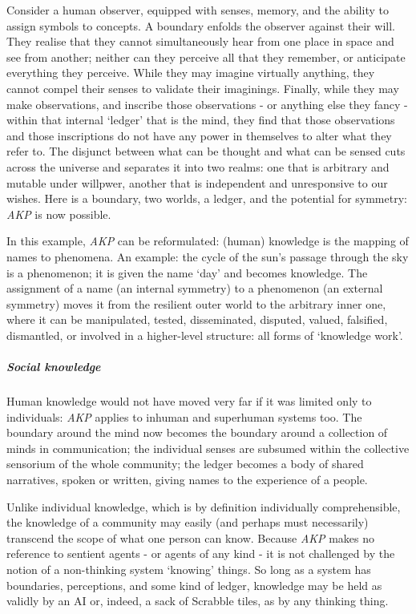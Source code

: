 \documentclass[a4paper,11pt,oneside]{book}
\begin{document}
Consider a human observer, equipped with senses, memory, and the ability to assign symbols to concepts. A boundary enfolds the observer against their will. They realise that they cannot simultaneously hear from one place in space and see from another; neither can they perceive all that they remember, or anticipate everything they perceive. While they may imagine virtually anything, they cannot compel their senses to validate their imaginings. Finally, while they may make observations, and inscribe those observations - or anything else they fancy - within that internal `ledger' that is the mind, they find that those observations and those inscriptions do not have any power in themselves to alter what they refer to. The disjunct between what can be thought and what can be sensed cuts across the universe and separates it into two realms: one that is arbitrary and mutable under willpwer, another that is independent and unresponsive to our wishes. Here is a boundary, two worlds, a ledger, and the potential for symmetry: \textit{AKP} is now possible.

In this example, \textit{AKP} can be reformulated: (human) knowledge is the mapping of names to phenomena. An example: the cycle of the sun's passage through the sky is a phenomenon; it is given the name `day' and becomes knowledge. The assignment of a name (an internal symmetry) to a phenomenon (an external symmetry) moves it from the resilient outer world to the arbitrary inner one, where it can be manipulated, tested, disseminated, disputed, valued, falsified, dismantled, or involved in a higher-level structure: all forms of `knowledge work'.

\subparagraph{Social knowledge}

Human knowledge would not have moved very far if it was limited only to individuals: \textit{AKP} applies to inhuman and superhuman systems too. The boundary around the mind now becomes the boundary around a collection of minds in communication; the individual senses are subsumed within the collective sensorium of the whole community; the ledger becomes a body of shared narratives, spoken or written, giving names to the experience of a people.

Unlike individual knowledge, which is by definition individually comprehensible, the knowledge of a community may easily (and perhaps must necessarily) transcend the scope of what one person can know. Because \textit{AKP} makes no reference to sentient agents - or agents of any kind - it is not challenged by the notion of a non-thinking system `knowing' things. So long as a system has boundaries, perceptions, and some kind of ledger, knowledge may be held as validly by an AI or, indeed, a sack of Scrabble tiles, as by any thinking thing.
\end{document}
